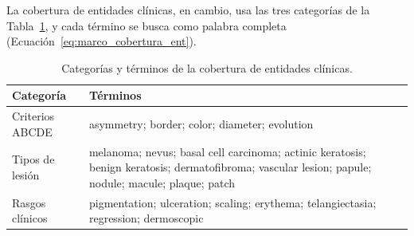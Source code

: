 La cobertura de entidades clínicas, en cambio, usa las tres categorías de la Tabla~\ref{tab:ap_entidades}, y cada
término se busca como palabra completa (Ecuación~\ref{eq:marco_cobertura_ent}).

\begin{table}[H]
    \centering
    \caption{Categorías y términos de la cobertura de entidades clínicas.}
    \label{tab:ap_entidades}
    \small
    \begin{tabularx}{\textwidth}{@{}>{\raggedright\arraybackslash}p{3.2cm}>{\raggedright\arraybackslash}X@{}}
        \toprule
        \textbf{Categoría} & \textbf{Términos} \\
        \midrule
        Criterios ABCDE & asymmetry; border; color; diameter; evolution \\
        \filasep
        Tipos de lesión & melanoma; nevus; basal cell carcinoma; actinic keratosis; benign keratosis;
            dermatofibroma; vascular lesion; papule; nodule; macule; plaque; patch \\
        \filasep
        Rasgos clínicos & pigmentation; ulceration; scaling; erythema; telangiectasia; regression; dermoscopic \\
        \bottomrule
    \end{tabularx}
\end{table}
